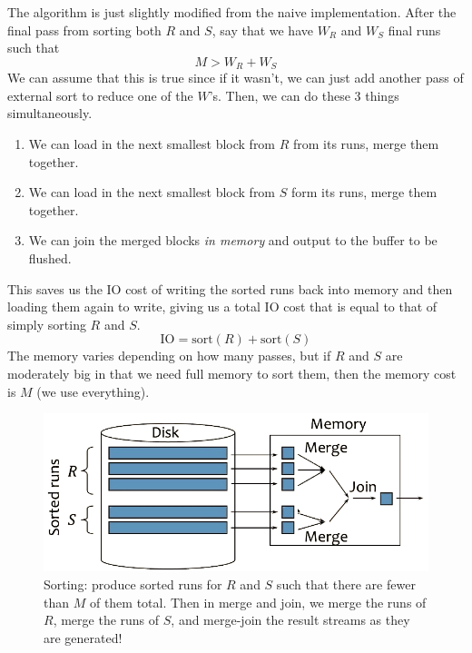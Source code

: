 \documentclass{article}
\begin{document}
      \begin{algo} 
        The algorithm is just slightly modified from the naive implementation. After the final pass from sorting both $R$ and $S$, say that we have $W_R$ and $W_S$ final runs such that 
        \begin{equation}
          M > W_R + W_S
        \end{equation} 
        We can assume that this is true since if it wasn't, we can just add another pass of external sort to reduce one of the $W$'s. Then, we can do these 3 things simultaneously. 
        \begin{enumerate}
          \item We can load in the next smallest block from $R$ from its runs, merge them together.
          \item We can load in the next smallest block from $S$ form its runs, merge them together. 
          \item We can join the merged blocks \textit{in memory} and output to the buffer to be flushed. 
        \end{enumerate}

        This saves us the IO cost of writing the sorted runs back into memory and then loading them again to write, giving us a total IO cost that is equal to that of simply sorting $R$ and $S$. 
        \begin{equation}
          \mathrm{IO} = \mathrm{sort}(R) + \mathrm{sort}(S)
        \end{equation} 
        The memory varies depending on how many passes, but if $R$ and $S$ are moderately big in that we need full memory to sort them, then the memory cost is $M$ (we use everything). 

        \begin{figure}[H]
          \centering 
          \includegraphics[scale=0.4]{img/smj_optim.png}
          \caption{Sorting: produce sorted runs for $R$ and $S$ such that there are fewer than $M$ of them total. Then in merge and join, we merge the runs of $R$, merge the runs of $S$, and merge-join the result streams as they are generated!} 
          \label{fig:smj_optim}
        \end{figure}
      \end{algo}
\end{document}

